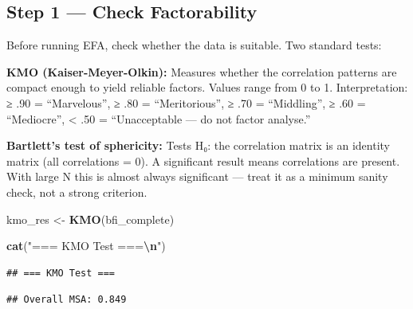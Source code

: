 \documentclass[
]{article}
\newenvironment{Shaded}{\begin{snugshade}}{\end{snugshade}}
\newcommand{\DecValTok}[1]{\textcolor[rgb]{0.00,0.00,0.81}{#1}}
\newcommand{\FunctionTok}[1]{\textcolor[rgb]{0.13,0.29,0.53}{\textbf{#1}}}
\newcommand{\NormalTok}[1]{#1}
\newcommand{\OtherTok}[1]{\textcolor[rgb]{0.56,0.35,0.01}{#1}}
\newcommand{\SpecialCharTok}[1]{\textcolor[rgb]{0.81,0.36,0.00}{\textbf{#1}}}
\newcommand{\StringTok}[1]{\textcolor[rgb]{0.31,0.60,0.02}{#1}}
\begin{document}
\subsection{Step 1 --- Check
Factorability}\label{step-1-check-factorability}

Before running EFA, check whether the data is suitable. Two standard
tests:

\textbf{KMO (Kaiser-Meyer-Olkin):} Measures whether the correlation
patterns are compact enough to yield reliable factors. Values range from
0 to 1. Interpretation: ≥ .90 = ``Marvelous'', ≥ .80 = ``Meritorious'',
≥ .70 = ``Middling'', ≥ .60 = ``Mediocre'', \textless{} .50 =
``Unacceptable --- do not factor analyse.''

\textbf{Bartlett's test of sphericity:} Tests H₀: the correlation matrix
is an identity matrix (all correlations = 0). A significant result means
correlations are present. With large N this is almost always significant
--- treat it as a minimum sanity check, not a strong criterion.

\begin{Shaded}
\begin{Highlighting}[]
\NormalTok{kmo\_res }\OtherTok{\textless{}{-}} \FunctionTok{KMO}\NormalTok{(bfi\_complete)}

\FunctionTok{cat}\NormalTok{(}\StringTok{"=== KMO Test ===}\SpecialCharTok{\textbackslash{}n}\StringTok{"}\NormalTok{)}
\end{Highlighting}
\end{Shaded}

\begin{verbatim}
## === KMO Test ===
\end{verbatim}

\begin{Shaded}
\end{Shaded}

\begin{verbatim}
## Overall MSA: 0.849
\end{verbatim}
\end{document}
